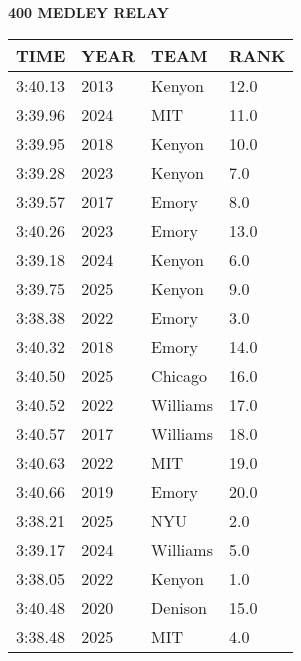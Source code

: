 \begin{center}
\begin{minipage}[t]{0.7\textwidth}
\centering
\textbf{400 MEDLEY RELAY}\\[0.05cm]
\begin{tabular}{@{}p{1.8cm}p{1.2cm}p{1.4cm}p{0.8cm}@{}}
\hline
\textbf{TIME} & \textbf{YEAR} & \textbf{TEAM} & \textbf{RANK} \\
\hline
3:40.13 & 2013 & Kenyon & 12.0 \\
3:39.96 & 2024 & MIT & 11.0 \\
3:39.95 & 2018 & Kenyon & 10.0 \\
3:39.28 & 2023 & Kenyon & 7.0 \\
3:39.57 & 2017 & Emory & 8.0 \\
3:40.26 & 2023 & Emory & 13.0 \\
3:39.18 & 2024 & Kenyon & 6.0 \\
3:39.75 & 2025 & Kenyon & 9.0 \\
3:38.38 & 2022 & Emory & 3.0 \\
3:40.32 & 2018 & Emory & 14.0 \\
3:40.50 & 2025 & Chicago & 16.0 \\
3:40.52 & 2022 & Williams & 17.0 \\
3:40.57 & 2017 & Williams & 18.0 \\
3:40.63 & 2022 & MIT & 19.0 \\
3:40.66 & 2019 & Emory & 20.0 \\
3:38.21 & 2025 & NYU & 2.0 \\
3:39.17 & 2024 & Williams & 5.0 \\
3:38.05 & 2022 & Kenyon & 1.0 \\
3:40.48 & 2020 & Denison & 15.0 \\
3:38.48 & 2025 & MIT & 4.0 \\
\hline
\end{tabular}
\end{minipage}
\end{center}

\vspace{0.4cm}


